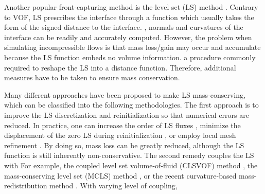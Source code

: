 Another popular front-capturing method is the level set (LS) method \citep{Sethian_levelset, Sussman_JCP_1994}. Contrary to VOF, LS prescribes the interface through a  function which usually takes the form of the signed distance to the interface. , normals and curvatures of the interface can be readily and accurately computed. However, the problem when simulating incompressible flows is that mass loss/gain may occur and accumulate because the LS function embeds no volume information.  a procedure commonly required to reshape the LS into a distance function. Therefore, additional measures have to be taken to ensure mass conservation.

Many different approaches have been proposed to make LS mass-conserving, which can be classified into the following  methodologies. The first approach is to improve the LS discretization and reinitialization so that numerical errors are reduced. In practice, one can increase the order of LS fluxes \citep{Nourgaliev_JCP_2007}, minimize the displacement of the zero LS during reinitialization , or employ local mesh refinement . By doing so, mass loss can be greatly reduced, although the LS function is still inherently non-conservative. The second remedy couples the LS with  For example,  the coupled level set volume-of-fluid (CLSVOF) method \citep{Sussman_JCP_2000}, the mass-conserving level set (MCLS) method \citep{Pijl_CVS_2008}, or the recent curvature-based mass-redistribution method \citep{Luo_JCP_2015}. With varying level of coupling, 

